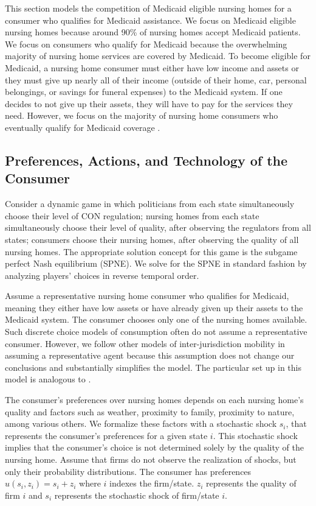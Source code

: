 \documentclass[../Main.tex]{subfiles}
\begin{document}
This section models the competition of Medicaid eligible nursing homes for a consumer who qualifies for Medicaid assistance. We focus on Medicaid eligible nursing homes because around 90\% of nursing homes accept Medicaid patients. We focus on consumers who qualify for Medicaid because the overwhelming majority of nursing home services are covered by Medicaid. To become eligible for Medicaid, a nursing home consumer must either have low income and assets or they must give up nearly all of their income (outside of their home, car, personal belongings, or savings for funeral expenses) to the Medicaid system. If one decides to not give up their assets, they will have to pay for the services they need. However, we focus on the majority of nursing home consumers who eventually qualify for Medicaid coverage .  

\subsection{Preferences, Actions, and Technology of the Consumer}
Consider a dynamic game in which politicians from each state simultaneously choose their level of CON regulation; nursing homes from each state simultaneously choose their level of quality, after observing the regulators from all states; consumers choose their nursing homes, after observing the quality of all nursing homes. The appropriate solution concept for this game is the subgame perfect Nash equilibrium (SPNE). We solve for the SPNE in standard fashion by analyzing players' choices in reverse temporal order. 

Assume a representative nursing home consumer who qualifies for Medicaid, meaning they either have low assets or have already given up their assets to the Medicaid system. The consumer chooses only one of the nursing homes available. Such discrete choice models of consumption often do not assume a representative consumer. However, we follow other models of inter-jurisdiction mobility in assuming a representative agent because this assumption does not change our conclusions and substantially simplifies the model. The particular set up in this model is analogous to \citet{basinger2004remodeling}.

The consumer's preferences over nursing homes depends on each nursing home's quality and factors such as weather, proximity to family, proximity to nature, among various others. We formalize these factors with a stochastic shock $s_i$, that represents the consumer's preferences for a given state $i$. This stochastic shock implies that the consumer's choice is not determined solely by the quality of the nursing home. Assume that firms do not observe the realization of shocks, but only their probability distributions. The consumer has preferences $u(s_i,z_i) = s_i + z_i$ where $i$ indexes the firm/state. $z_i$ represents the quality of firm $i$ and $s_i$ represents the stochastic shock of firm/state $i$. 
\end{document}
